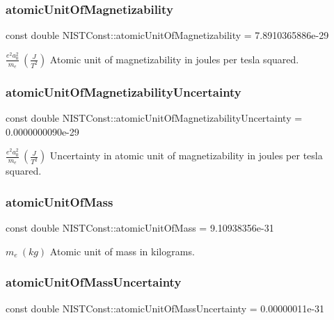 \subsubsection{\texorpdfstring{atomic\+Unit\+Of\+Magnetizability}{atomicUnitOfMagnetizability}}
{\footnotesize\ttfamily const double N\+I\+S\+T\+Const\+::atomic\+Unit\+Of\+Magnetizability = 7.\+8910365886e-\/29}

$\frac{e^2a_0^2}{m_e} \ (\frac{J}{T^2})$ Atomic unit of magnetizability in joules per tesla squared. \mbox{\label{group___atomic_unit_ga660abcd5b236c672a4f71398bc4894b6}} 
\subsubsection{\texorpdfstring{atomic\+Unit\+Of\+Magnetizability\+Uncertainty}{atomicUnitOfMagnetizabilityUncertainty}}
{\footnotesize\ttfamily const double N\+I\+S\+T\+Const\+::atomic\+Unit\+Of\+Magnetizability\+Uncertainty = 0.\+0000000090e-\/29}

$\frac{e^2a_0^2}{m_e} \ (\frac{J}{T^2})$ Uncertainty in atomic unit of magnetizability in joules per tesla squared. \mbox{\label{group___atomic_unit_ga61a2da51489f7bb8965e9e4747db34a7}} 
\subsubsection{\texorpdfstring{atomic\+Unit\+Of\+Mass}{atomicUnitOfMass}}
{\footnotesize\ttfamily const double N\+I\+S\+T\+Const\+::atomic\+Unit\+Of\+Mass = 9.\+10938356e-\/31}

$m_e \ (kg)$ Atomic unit of mass in kilograms. \mbox{\label{group___atomic_unit_gaa9459757651cf86d89e722db9911b0e1}} 
\subsubsection{\texorpdfstring{atomic\+Unit\+Of\+Mass\+Uncertainty}{atomicUnitOfMassUncertainty}}
{\footnotesize\ttfamily const double N\+I\+S\+T\+Const\+::atomic\+Unit\+Of\+Mass\+Uncertainty = 0.\+00000011e-\/31}

